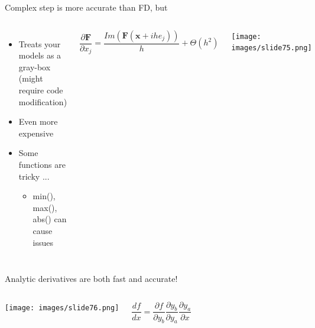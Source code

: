 \documentclass[aspectratio=169, usenames,dvipsnames, 14pt]{beamer}
\begin{document}
 \begin{frame}{Complex step is more accurate than FD, but}
     \begin{columns}
             \begin{itemize}
                 \item Treats your models as a gray-box (might require code modification)
                 \item Even more expensive
                 \item Some functions are tricky ...
                     \begin{itemize}
                         \item min(), max(), abs() can cause issues
                     \end{itemize}
             \end{itemize}
 
             \vspace{-0.5cm}
 
             \begin{equation*}
                 \frac{\partial \textbf{F}}{\partial x_{j}} =\frac{Im(\textbf{F}(\textbf{x}+ihe_{j}))}{h} +\Theta (h^{2})
             \end{equation*}
 
             \texttt{[image: images/slide75.png]}
     \end{columns}
 
 \end{frame}    



 \begin{frame}{Analytic derivatives are both fast and accurate!}
 \begin{columns}
         \texttt{[image: images/slide76.png]}
 
         \vspace{2cm}
         \begin{equation*}
             \frac{df}{dx} = \frac{\partial f}{\partial y_{b}} \frac{\partial y_{b}}{\partial y_{a}} \frac{\partial y_{a}}{\partial x}
         \end{equation*}
 \end{columns}
 
 \end{frame}
\end{document}
